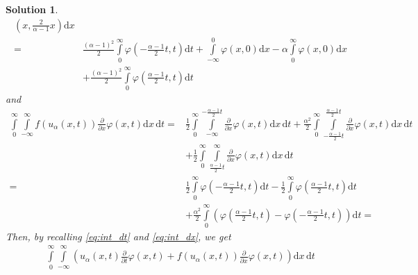 \documentclass[10pt,letterpaper]{article}
\theoremstyle{break}
\newtheorem{mysolution}{Solution}
\newenvironment{solution}{\begin{mysolution}}{\end{mysolution}}
\begin{document}
\begin{solution}
\begin{equation}
\begin{aligned}
		\left(x,\frac{2}{\alpha-1}x\right)
		\text{d}x
		\\
		=
		&
		\frac{(\alpha-1)^2}{2}
		\int\limits_{0}^{\infty}
		\varphi
		\left(-\frac{\alpha-1}{2}t,t\right)
		\text{d}t
		+
		\int\limits_{-\infty}^{0}
		\varphi
		\left(x,0\right)
		\text{d}x
		-\alpha
		\int\limits_{0}^{\infty}
		\varphi
		\left(x,0\right)
		\text{d}x \\
		&
		+
		\frac{(\alpha-1)^2}{2}
		\int\limits_{0}^{\infty}
		\varphi
		\left(\frac{\alpha-1}{2}t,t\right)
		\text{d}t
	\end{aligned}
	\end{equation}
	and
	\begin{equation}\label{eq:int_dx}
	\begin{aligned}
		\int\limits_{0}^{\infty}
		\int\limits_{-\infty}^{\infty}
		f(u_\alpha(x,t))
		\frac{\partial}{\partial x} \varphi(x,t)
		\text{d}x\, \text{d}t
		=
		&
		\frac{1}{2}
		\int\limits_{0}^{\infty}
		\int\limits_{-\infty}^{-\frac{\alpha-1}{2}t}
		\frac{\partial}{\partial x} \varphi(x,t)
		\text{d}x\, \text{d}t
		+
		\frac{\alpha^2}{2}
		\int\limits_{0}^{\infty}
		\int\limits_{-\frac{\alpha-1}{2}t}^{\frac{\alpha-1}{2}t}
		\frac{\partial}{\partial x} \varphi(x,t)
		\text{d}x\, \text{d}t \\
		&
		+
		\frac{1}{2}
		\int\limits_{0}^{\infty}
		\int\limits_{\frac{\alpha-1}{2}t}^{\infty}
		\frac{\partial}{\partial x} \varphi(x,t)
		\text{d}x\, \text{d}t \\
		=
		&
		\frac{1}{2}
		\int\limits_{0}^{\infty}
		\varphi
		\left(
			-\frac{\alpha-1}{2}t,t
		\right)
		\text{d}t
		-
		\frac{1}{2}
		\int\limits_{0}^{\infty}
		\varphi
			\left(
				\frac{\alpha-1}{2}t,t
			\right)
		\text{d}t \\
		&
		+
		\frac{\alpha^2}{2}
		\int\limits_{0}^{\infty}
		\left(
			\varphi
			\left(
				\frac{\alpha-1}{2}t,t
			\right)
			-
			\varphi
			\left(
				-\frac{\alpha-1}{2}t,t
			\right)
		\right)
		\text{d}t
		=
	\end{aligned}
	\end{equation}
	Then, by recalling \eqref{eq:int_dt} and \eqref{eq:int_dx}, we get
	\begin{align}
		\int\limits_{0}^{\infty}
		\int\limits_{-\infty}^{\infty}
		\left(
			u_\alpha(x,t)
			\frac{\partial}{\partial t} \varphi(x,t)
			+
			f(u_\alpha(x,t))
			\frac{\partial}{\partial x} \varphi(x,t)
		\right)
		\text{d}x\, \text{d}t
	\end{align}
\end{solution}
\end{document}

